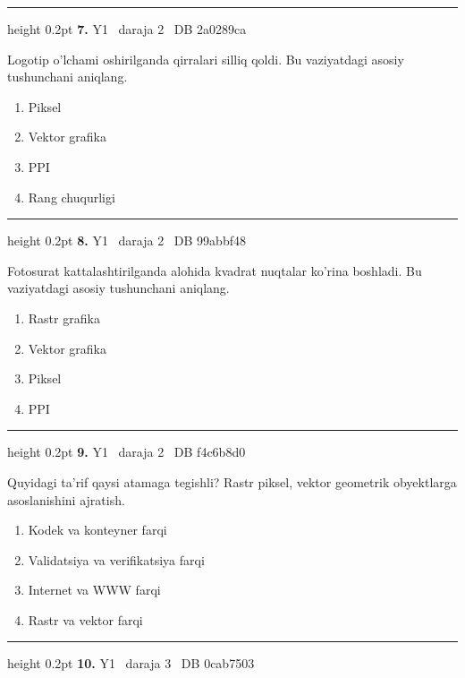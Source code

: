 \documentclass[10pt,a4paper,oneside]{article}
\begin{document}
\vspace{2mm}\hrule height 0.2pt \vspace{4mm}
\hypertarget{q7}{\textbf{\color{ink}7.}}  {\color{muted}\scriptsize Y1 \textbullet\ daraja 2 \textbullet\ DB 2a0289ca}
\par
Logotip o'lchami oshirilganda qirralari silliq qoldi. Bu vaziyatdagi asosiy tushunchani aniqlang.
\begin{enumerate}[label=\Alph*),leftmargin=9mm]
\item Piksel
\item Vektor grafika
\item PPI
\item Rang chuqurligi
\end{enumerate}
\vspace{2mm}\hrule height 0.2pt \vspace{4mm}
\hypertarget{q8}{\textbf{\color{ink}8.}}  {\color{muted}\scriptsize Y1 \textbullet\ daraja 2 \textbullet\ DB 99abbf48}
\par
Fotosurat kattalashtirilganda alohida kvadrat nuqtalar ko'rina boshladi. Bu vaziyatdagi asosiy tushunchani aniqlang.
\begin{enumerate}[label=\Alph*),leftmargin=9mm]
\item Rastr grafika
\item Vektor grafika
\item Piksel
\item PPI
\end{enumerate}
\vspace{2mm}\hrule height 0.2pt \vspace{4mm}
\hypertarget{q9}{\textbf{\color{ink}9.}}  {\color{muted}\scriptsize Y1 \textbullet\ daraja 2 \textbullet\ DB f4c6b8d0}
\par
Quyidagi ta'rif qaysi atamaga tegishli? Rastr piksel, vektor geometrik obyektlarga asoslanishini ajratish.
\begin{enumerate}[label=\Alph*),leftmargin=9mm]
\item Kodek va konteyner farqi
\item Validatsiya va verifikatsiya farqi
\item Internet va WWW farqi
\item Rastr va vektor farqi
\end{enumerate}
\vspace{2mm}\hrule height 0.2pt \vspace{4mm}
\hypertarget{q10}{\textbf{\color{ink}10.}}  {\color{muted}\scriptsize Y1 \textbullet\ daraja 3 \textbullet\ DB 0cab7503}
\end{document}
